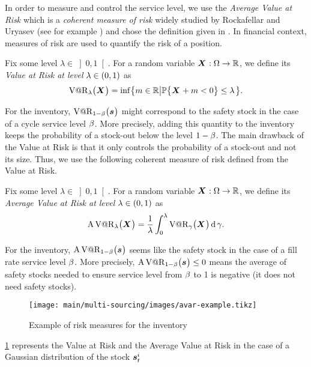 In order to measure and control the service level, we use the \emph{Average Value at Risk} which is a \emph{coherent measure of risk} widely studied by Rockafellar and Uryasev (see for example \cite{Rockafellar2000,Rockafellar2002}) and chose the definition given in \cite{Follmer2004}.
In financial context, measures of risk are used to quantify the risk of a position.


\begin{defn}
Fix some level $\lambda\in\left]0,1\right[$. For a random variable $\va X:\scenarios\to\RR$, we define its \emph{Value at Risk at level $\lambda\in\bracket{0,1}$} as
$$\VaR_{\lambda}\bracket{\va X} = \inf\crbracket{m\in\RR\left|\prob\crbracket{\va X+m<0}\le\lambda\right.}.$$
\end{defn}
For the inventory, $\VaR_{1-\servicelvl}\bracket{\va\inventory}$ might correspond to the safety stock in the case of a cycle service level $\beta$.
More precisely, adding this quantity to the inventory keeps the probability of a stock-out below the level $1-\beta$.
The main drawback of the Value at Risk is that it only controls the probability of a stock-out and not its size.
Thus, we use the following coherent measure of risk defined from the Value at Risk.


\begin{defn}
Fix some level $\lambda\in\left]0,1\right[$. For a random variable $\va X:\scenarios\to\RR$, we define its \emph{Average Value at Risk at level $\lambda\in\bracket{0,1}$} as
$$\AVaR_{\lambda}\bracket{\va X} = \frac{1}{\lambda}\int_0^{\lambda}\VaR_{\gamma}\bracket{\va X}\diff\gamma.$$
\end{defn}
For the inventory, $\AVaR_{1-\servicelvl}\bracket{\va\inventory}$ seems like the safety stock in the case of a fill rate service level $\beta$.
More precisely, $\AVaR_{1-\servicelvl}\bracket{\va\inventory}\le 0$ means the average of safety stocks needed to ensure service level from $\beta$ to 1 is negative (\ie it does not need safety stocks).


\begin{figure}[h]
  \centering
  \texttt{[image: main/multi-sourcing/images/avar-example.tikz]}
  \caption{Example of risk measures for the inventory}
  \label{fig:avar-examples}
\end{figure}


\cref{fig:avar-examples} represents the Value at Risk and the Average Value at Risk in the case of a Gaussian distribution of the stock $\va\inventory_t^i$


